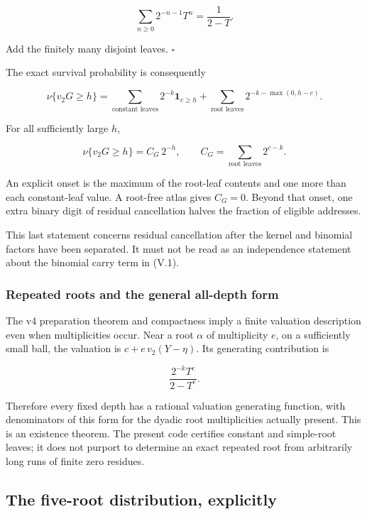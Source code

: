 \documentclass[11pt,letterpaper]{article}
\begin{document}
\[
\sum_{n\ge0}2^{-n-1}T^n=\frac1{2-T}.
\]

Add the finitely many disjoint leaves. \(\square\)

The exact survival probability is consequently

\[
\boxed{
\nu\{v_2G\ge h\}=
\sum_{\text{constant leaves}}2^{-k}\mathbf1_{c\ge h}
+\sum_{\text{root leaves}}2^{-k-\max(0,h-c)}.
} \tag{V.5}
\]

For all sufficiently large \(h\),

\[
\boxed{
\nu\{v_2G\ge h\}=C_G\,2^{-h},
\qquad C_G=\sum_{\text{root leaves}}2^{c-k}.
} \tag{V.6}
\]

An explicit onset is the maximum of the root-leaf contents and one more than each constant-leaf value. A root-free atlas gives \(C_G=0\). Beyond that onset, one extra binary digit of residual cancellation halves the fraction of eligible addresses.

This last statement concerns residual cancellation after the kernel and binomial factors have been separated. It must not be read as an independence statement about the binomial carry term in (V.1).

\subsubsection{Repeated roots and the general all-depth form}\label{repeated-roots-and-the-general-all-depth-form}

The v4 preparation theorem and compactness imply a finite valuation description even when multiplicities occur. Near a root \(\alpha\) of multiplicity \(e\), on a sufficiently small ball, the valuation is \(c+e\,v_2(Y-\eta)\). Its generating contribution is

\[
\frac{2^{-k}T^c}{2-T^e}.
\]

Therefore every fixed depth has a rational valuation generating function, with denominators of this form for the dyadic root multiplicities actually present. This is an existence theorem. The present code certifies constant and simple-root leaves; it does not purport to determine an exact repeated root from arbitrarily long runs of finite zero residues.

\subsection{The five-root distribution, explicitly}\label{the-five-root-distribution-explicitly}
\end{document}

